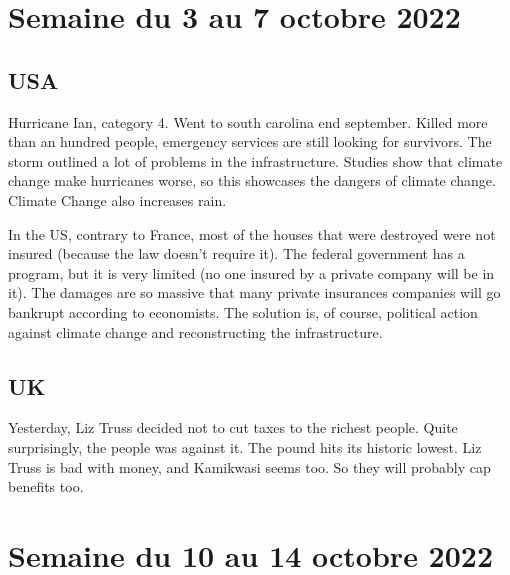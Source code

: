 \documentclass[a4paper,12pt]{book}
\begin{document}
\section{Semaine du 3 au 7 octobre 2022}
\subsection{USA}
Hurricane Ian, category 4. Went to south carolina end september. Killed more than an hundred people, emergency services are still looking for survivors. The storm outlined a lot of problems in the infrastructure. Studies show that climate change make hurricanes worse, so this showcases the dangers of climate change. Climate Change also increases rain.
\par In the US, contrary to France, most of the houses that were destroyed were not insured (because the law doesn't require it). The federal government has a program, but it is very limited (no one insured by a private company will be in it). The damages are so massive that many private insurances companies will go bankrupt according to economists. The solution is, of course, political action against climate change and reconstructing the infrastructure. 

\subsection{UK}
Yesterday, Liz Truss decided not to cut taxes to the richest people. Quite surprisingly, the people was against it. The pound hits its historic lowest. Liz Truss is bad with money, and Kamikwasi seems too. So they will probably cap benefits too.

\section{Semaine du 10 au 14 octobre 2022}
\end{document}
